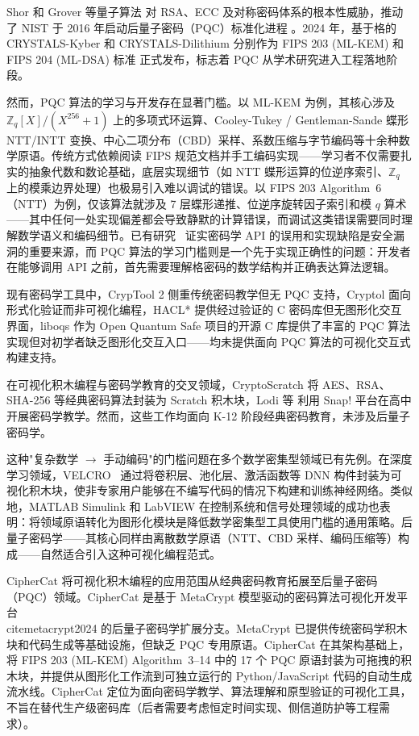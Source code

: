 \documentclass[preprint,12pt,a4paper]{elsarticle}
\begin{document}
Shor 和 Grover 等量子算法 \cite{shor1994} 对 RSA、ECC 及对称密码体系的根本性威胁，推动了 NIST 于 2016 年启动后量子密码（PQC）标准化进程 \cite{nistir8413}。2024 年，基于格的 CRYSTALS-Kyber \cite{kyber} 和 CRYSTALS-Dilithium \cite{dilithium} 分别作为 FIPS 203 (ML-KEM) 和 FIPS 204 (ML-DSA) 标准 \cite{fips203,fips204} 正式发布，标志着 PQC 从学术研究进入工程落地阶段。

然而，PQC 算法的学习与开发存在显著门槛。以 ML-KEM 为例，其核心涉及 $\mathbb{Z}_q[X]/(X^{256}+1)$ 上的多项式环运算、Cooley-Tukey / Gentleman-Sande 蝶形 NTT/INTT 变换、中心二项分布（CBD）采样、系数压缩与字节编码等十余种数学原语。传统方式依赖阅读 FIPS 规范文档并手工编码实现——学习者不仅需要扎实的抽象代数和数论基础，底层实现细节（如 NTT 蝶形运算的位逆序索引、$\mathbb{Z}_q$ 上的模乘边界处理）也极易引入难以调试的错误。以 FIPS 203 Algorithm~6（NTT）为例，仅该算法就涉及 7 层蝶形递推、位逆序旋转因子索引和模 $q$ 算术——其中任何一处实现偏差都会导致静默的计算错误，而调试这类错误需要同时理解数学语义和编码细节。已有研究~\cite{nadi2016,mouha2018,hazhirpasand2021} 证实密码学 API 的误用和实现缺陷是安全漏洞的重要来源，而 PQC 算法的学习门槛则是一个先于实现正确性的问题：开发者在能够调用 API 之前，首先需要理解格密码的数学结构并正确表达算法逻辑。

现有密码学工具中，CrypTool 2 \cite{kopal2022} 侧重传统密码教学但无 PQC 支持，Cryptol \cite{lewis2003} 面向形式化验证而非可视化编程，HACL* \cite{hacl2017} 提供经过验证的 C 密码库但无图形化交互界面，liboqs \cite{stebila2017} 作为 Open Quantum Safe 项目的开源 C 库提供了丰富的 PQC 算法实现但对初学者缺乏图形化交互入口——均未提供面向 PQC 算法的可视化交互式构建支持。

在可视化积木编程与密码学教育的交叉领域，CryptoScratch \cite{percival2022cryptoscratch} 将 AES、RSA、SHA-256 等经典密码算法封装为 Scratch 积木块，Lodi 等 \cite{lodi2022cryptography} 利用 Snap! 平台在高中开展密码学教学。然而，这些工作均面向 K-12 阶段经典密码教育，未涉及后量子密码学。

这种"复杂数学 $\rightarrow$ 手动编码"的门槛问题在多个数学密集型领域已有先例。在深度学习领域，VELCRO~\cite{lim2024velcro} 通过将卷积层、池化层、激活函数等 DNN 构件封装为可视化积木块，使非专家用户能够在不编写代码的情况下构建和训练神经网络。类似地，MATLAB Simulink 和 LabVIEW 在控制系统和信号处理领域的成功也表明：将领域原语转化为图形化模块是降低数学密集型工具使用门槛的通用策略。后量子密码学——其核心同样由离散数学原语（NTT、CBD 采样、编码压缩等）构成——自然适合引入这种可视化编程范式。

CipherCat 将可视化积木编程的应用范围从经典密码教育拓展至后量子密码（PQC）领域。CipherCat 是基于 MetaCrypt 模型驱动的密码算法可视化开发平台~\\cite{metacrypt2024} 的后量子密码学扩展分支。MetaCrypt 已提供传统密码学积木块和代码生成等基础设施，但缺乏 PQC 专用原语。CipherCat 在其架构基础上，将 FIPS 203 (ML-KEM) Algorithm~3--14 中的 17 个 PQC 原语封装为可拖拽的积木块，并提供从图形化工作流到可独立运行的 Python/JavaScript 代码的自动生成流水线。CipherCat 定位为面向密码学教学、算法理解和原型验证的可视化工具，不旨在替代生产级密码库（后者需要考虑恒定时间实现、侧信道防护等工程需求）。
\end{document}
